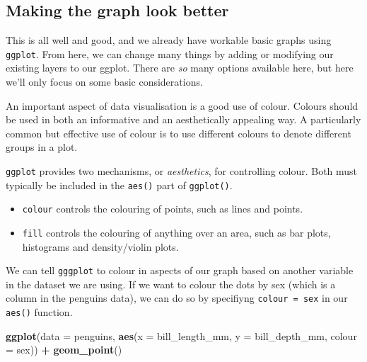\documentclass[
]{book}
\newenvironment{Shaded}{\begin{snugshade}}{\end{snugshade}}
\newcommand{\AttributeTok}[1]{\textcolor[rgb]{0.13,0.29,0.53}{#1}}
\newcommand{\FunctionTok}[1]{\textcolor[rgb]{0.13,0.29,0.53}{\textbf{#1}}}
\newcommand{\NormalTok}[1]{#1}
\newcommand{\SpecialCharTok}[1]{\textcolor[rgb]{0.81,0.36,0.00}{\textbf{#1}}}
\providecommand{\tightlist}{%
  \setlength{\itemsep}{0pt}\setlength{\parskip}{0pt}}
\begin{document}
\hypertarget{making-the-graph-look-better}{%
\subsection{Making the graph look better}\label{making-the-graph-look-better}}

This is all well and good, and we already have workable basic graphs using \texttt{ggplot}. From here, we can change many things by adding or modifying our existing layers to our ggplot. There are \emph{so} many options available here, but here we'll only focus on some basic considerations.

An important aspect of data visualisation is a good use of colour. Colours should be used in both an informative and an aesthetically appealing way. A particularly common but effective use of colour is to use different colours to denote different groups in a plot.

\texttt{ggplot} provides two mechanisms, or \emph{aesthetics}, for controlling colour. Both must typically be included in the \texttt{aes()} part of \texttt{ggplot()}.

\begin{itemize}
\tightlist
\item
  \texttt{colour} controls the colouring of points, such as lines and points.
\item
  \texttt{fill} controls the colouring of anything over an area, such as bar plots, histograms and density/violin plots.
\end{itemize}

We can tell \texttt{gggplot} to colour in aspects of our graph based on another variable in the dataset we are using. If we want to colour the dots by sex (which is a column in the penguins data), we can do so by specifiyng \texttt{colour\ =\ sex} in our \texttt{aes()} function.

\begin{Shaded}
\begin{Highlighting}[]
\FunctionTok{ggplot}\NormalTok{(}\AttributeTok{data =}\NormalTok{ penguins, }\FunctionTok{aes}\NormalTok{(}\AttributeTok{x =}\NormalTok{ bill\_length\_mm, }\AttributeTok{y =}\NormalTok{ bill\_depth\_mm, }\AttributeTok{colour =}\NormalTok{ sex)) }\SpecialCharTok{+}
  \FunctionTok{geom\_point}\NormalTok{()}
\end{Highlighting}
\end{Shaded}
\end{document}
